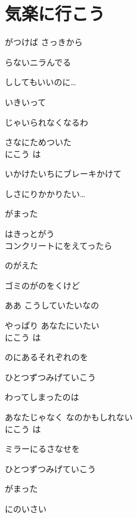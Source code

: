 \section{ 気楽に行こう}
\large{

がつけば さっきから

らないニラんでる

ししてもいいのに…

いきいって

じゃいられなくなるわ

さなにためついた
\\

にこう は

いかけたいちにブレーキかけて

しさにりかかりたい…

がまった

はきっとがう
\\

コンクリートにをえてったら

のがえた

ゴミのがのをくけど

ああ こうしていたいなの

やっぱり あなたにいたい
\\

にこう は

のにあるそれぞれのを

ひとつずつみげていこう

わってしまったのは

あなたじゃなく なのかもしれない
\\

にこう は

ミラーにるさなせを

ひとつずつみげていこう

がまった

にのいさい

}